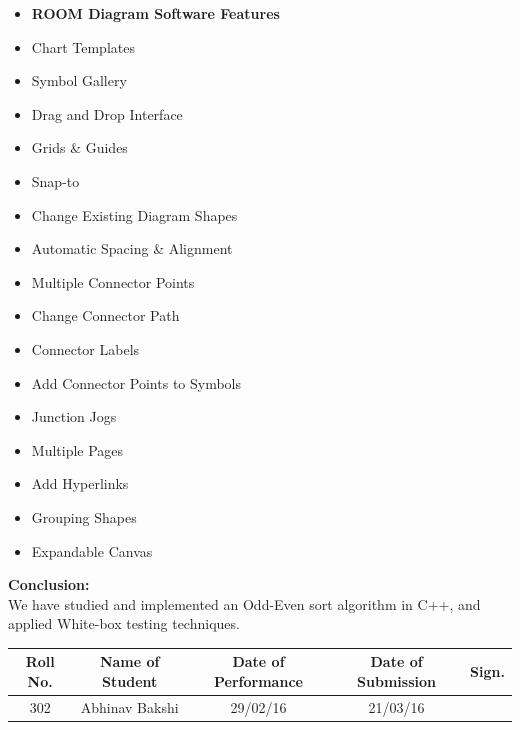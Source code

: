 \documentclass[a4paper,12pt]{article}
\begin{document}
\begin{itemize}
	\item\textbf{ROOM Diagram Software Features}
	
	\item Chart Templates
	
	
	
	\item Symbol Gallery
	
	\item Drag and Drop Interface
	
	
	
	\item Grids \& Guides
	
	\item Snap-to
	
	
	
	\item Change Existing Diagram Shapes
	
	\item Automatic Spacing \& Alignment
	
	
	
	\item Multiple Connector Points
	
	\item Change Connector Path
	
	
	
	\item Connector Labels
	
	\item Add Connector Points to Symbols
	
	
	
	\item Junction Jogs
	
	\item Multiple Pages
	
	
	
	\item Add Hyperlinks
	
	\item Grouping Shapes
	
	
	
	\item Expandable Canvas
	
\end{itemize}

\noindent \textbf{Conclusion: }	\\
We have studied and implemented an Odd-Even sort algorithm in C++, and applied White-box testing techniques.

\begin{center}
\begin{tabular}
{|c|c|c|c|c|}\hline
{\bf Roll No.}		&{\bf Name of Student}	&{\bf Date of Performance}  				&{\bf Date of Submission}	&{\bf Sign.}  \\    \hline
{302}	&	{Abhinav Bakshi}& 	{29/02/16}	&  {21/03/16} \\ \hline
\end{tabular}\\ 
\end{center}
\end{document}
